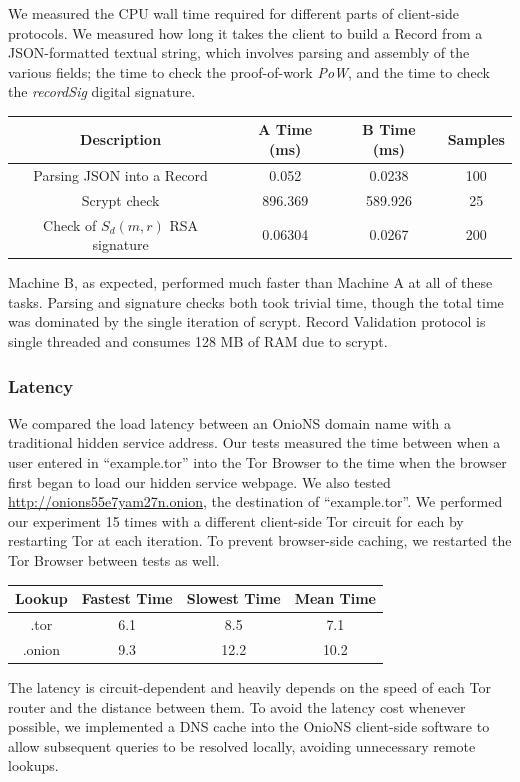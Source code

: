 We measured the CPU wall time required for different parts of client-side protocols. We measured how long it takes the client to build a Record from a JSON-formatted textual string, which involves parsing and assembly of the various fields; the time to check the proof-of-work \emph{PoW}, and the time to check the \emph{recordSig} digital signature.

\renewcommand{\arraystretch}{1}
\begin{center}
    \begin{tabular}{ | c | c | c | c |}
    \hline
    \textbf{Description} & \textbf{A Time (ms)} & \textbf{B Time (ms)} & \textbf{Samples} \\
    \hline
    Parsing JSON into a Record & 0.052 & 0.0238 & 100 \\ \hline
	Scrypt check & 896.369 & 589.926 & 25 \\ \hline
	Check of $ S_{d}(m, r) $ RSA signature & 0.06304 & 0.0267 & 200 \\
	\hline
    \end{tabular}
\end{center}

Machine B, as expected, performed much faster than Machine A at all of these tasks. Parsing and signature checks both took trivial time, though the total time was dominated by the single iteration of scrypt. Record Validation protocol is single threaded and consumes 128 MB of RAM due to scrypt.

\subsubsection{Latency}

We compared the load latency between an OnioNS domain name with a traditional hidden service address. Our tests measured the time between when a user entered in ``example.tor'' into the Tor Browser to the time when the browser first began to load our hidden service webpage. We also tested \url{http://onions55e7yam27n.onion}, the destination of ``example.tor''. We performed our experiment 15 times with a different client-side Tor circuit for each by restarting Tor at each iteration. To prevent browser-side caching, we restarted the Tor Browser between tests as well. 

\renewcommand{\arraystretch}{1}
\begin{center}
    \begin{tabular}{ | c | c | c | c |}
    \hline
    \textbf{Lookup} & \textbf{Fastest Time} & \textbf{Slowest Time} & \textbf{Mean Time} \\
    \hline
    .tor & 6.1 & 8.5 & 7.1 \\ \hline
	.onion & 9.3 & 12.2 & 10.2 \\
	\hline
    \end{tabular}
\end{center}

The latency is circuit-dependent and heavily depends on the speed of each Tor router and the distance between them. To avoid the latency cost whenever possible, we implemented a DNS cache into the OnioNS client-side software to allow subsequent queries to be resolved locally, avoiding unnecessary remote lookups.
